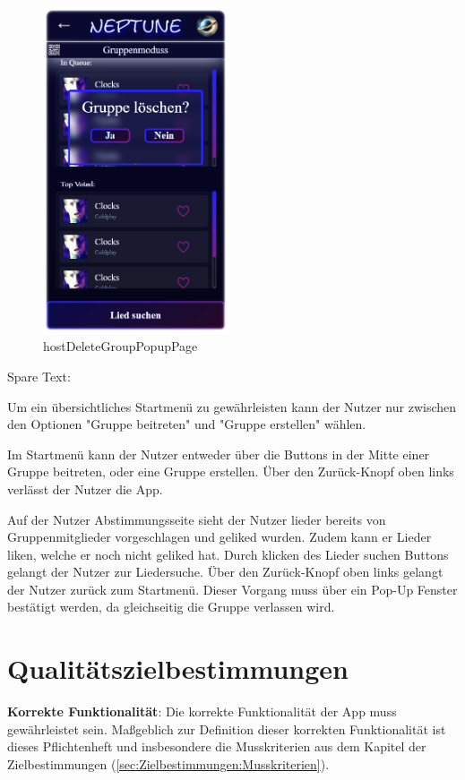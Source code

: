 \documentclass[oneside, ngerman]{sdqtechreport}
\begin{document}
\begin{figure}
   \begin{minipage}[b]{.4\linewidth} %
      \includegraphics[width=5.5cm]{LATEX/Pflichtenheft/GraphicDesigns/hostDeleteGroupPopupPage.png}
      \caption{hostDeleteGroupPopupPage}
   \end{minipage}
\end{figure}

Spare Text:

Um ein übersichtliches Startmenü zu gewährleisten kann der Nutzer nur zwischen den Optionen "Gruppe beitreten" und "Gruppe erstellen" wählen. 

Im Startmenü kann der Nutzer entweder über die Buttons in der Mitte einer Gruppe beitreten, oder eine Gruppe erstellen. Über den Zurück-Knopf oben links verlässt der Nutzer die App.

Auf der Nutzer Abstimmungsseite sieht der Nutzer lieder bereits von Gruppenmitglieder vorgeschlagen und geliked wurden. Zudem kann er Lieder liken, welche er noch nicht geliked hat. Durch klicken des Lieder suchen Buttons gelangt der Nutzer zur Liedersuche. Über den Zurück-Knopf oben links gelangt der Nutzer zurück zum Startmenü. Dieser Vorgang muss über ein Pop-Up Fenster bestätigt werden, da gleichseitig die Gruppe verlassen wird.




\chapter{Qualitätszielbestimmungen}
\label{chap:Qualitätszielbestimmungen}

\textbf{Korrekte Funktionalität}: Die korrekte Funktionalität der App muss gewährleistet sein. Maßgeblich zur Definition dieser korrekten Funktionalität ist dieses Pflichtenheft und insbesondere die Musskriterien aus dem Kapitel der Zielbestimmungen (\ref{sec:Zielbestimmungen:Musskriterien}).
\end{document}
